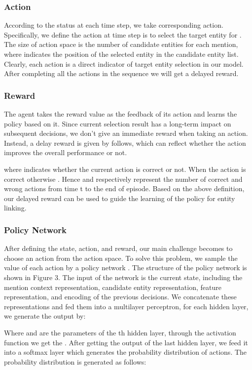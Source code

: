 \documentclass[sigconf]{acmart}
\begin{document}
\subsubsection*{Action}
According to the status at each time step, we take corresponding action. Specifically, we define the action at time step  is to select the target entity  for . The size of action space is the number of candidate entities for each mention, where  indicates the position of the selected entity in the candidate entity list. Clearly, each action is a direct indicator of target entity selection in our model. After completing all the actions in the sequence we will get a delayed reward.



\subsubsection*{Reward}
The agent takes the reward value as the feedback of its action and learns the policy based on it. Since current selection result has a long-term impact on subsequent decisions, we don't give an immediate reward when taking an action. Instead, a delay reward is given by follows, which can reflect whether the action improves the overall performance or not.

where  indicates whether the current action is correct or not. When the action is correct  otherwise . Hence  and  respectively represent the number of correct and wrong actions from time t to the end of episode. Based on the above definition, our delayed reward can be used to guide the learning of the policy for entity linking.

\subsubsection*{Policy Network}
After defining the state, action, and reward, our main challenge becomes to choose an action from the action space. To solve this problem, we sample the value of each action by a policy network . The structure of the policy network is shown in Figure 3. The input of the network is the current state, including the mention context representation, candidate entity representation, feature representation, and encoding of the previous decisions. We concatenate these representations and fed them into a multilayer perceptron, for each hidden layer, we generate the output by:

Where  and  are the parameters of the th hidden layer, through the  activation function we get the . After getting the output of the last hidden layer, we feed it into a softmax layer which generates the probability distribution of actions. The probability distribution is generated as follows:
\end{document}
